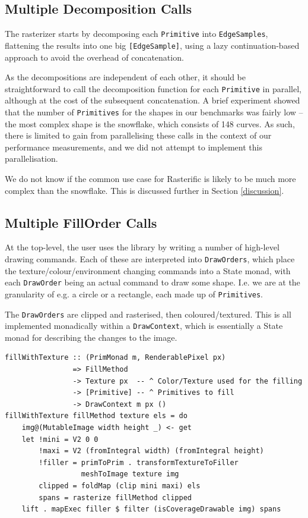 \documentclass[12pt, a4paper]{article}
\begin{document}
\subsection{Multiple Decomposition Calls}

The rasterizer starts by decomposing each \texttt{Primitive} into \texttt{EdgeSamples}, flattening the results into one big \texttt{[EdgeSample]}, using a lazy continuation-based approach to avoid the overhead of concatenation.

As the decompositions are independent of each other, it should be straightforward to call the decomposition function for each \texttt{Primitive} in parallel, although at the cost of the subsequent concatenation. A brief experiment showed that the number of \texttt{Primitives} for the shapes in our benchmarks was fairly low -- the most complex shape is the snowflake, which consists of 148 curves. As such, there is limited to gain from parallelising these calls in the context of our performance measurements, and we did not attempt to implement this parallelisation.

We do not know if the common use case for Rasterific is likely to be much more complex than the snowflake. This is discussed further in Section \ref{discussion}.

\subsection{Multiple FillOrder Calls}

At the top-level, the user uses the library by writing a number of high-level drawing commands. Each of these are interpreted into \texttt{DrawOrders}, which place the texture/colour/environment changing commands into a State monad, with each \texttt{DrawOrder} being an actual command to draw some shape. I.e. we are at the granularity of e.g. a circle or a rectangle, each made up of \texttt{Primitives}.

The \texttt{DrawOrders} are clipped and rasterised, then coloured/textured. This is all implemented monadically within a \texttt{DrawContext}, which is essentially a State monad for describing the changes to the image.

\begin{lstlisting}[caption={Clipping, rasterising, and texturing the \texttt{DrawOrder}.}]
fillWithTexture :: (PrimMonad m, RenderablePixel px)
                => FillMethod
                -> Texture px  -- ^ Color/Texture used for the filling
                -> [Primitive] -- ^ Primitives to fill
                -> DrawContext m px ()
fillWithTexture fillMethod texture els = do
    img@(MutableImage width height _) <- get
    let !mini = V2 0 0
        !maxi = V2 (fromIntegral width) (fromIntegral height)
        !filler = primToPrim . transformTextureToFiller
                  meshToImage texture img
        clipped = foldMap (clip mini maxi) els
        spans = rasterize fillMethod clipped
    lift . mapExec filler $ filter (isCoverageDrawable img) spans
\end{lstlisting}
\end{document}
